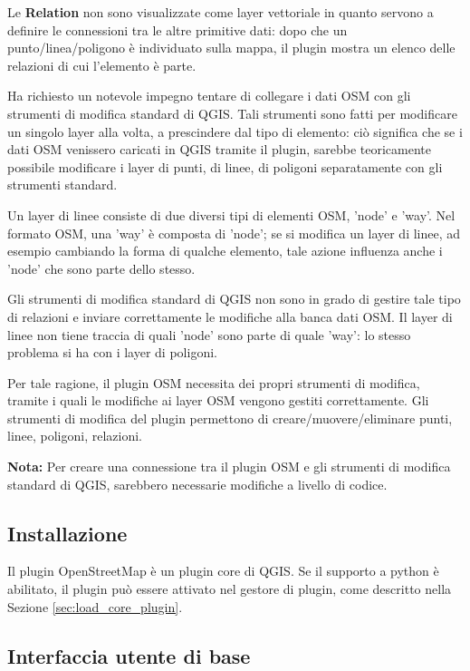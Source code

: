 Le \textbf{Relation} non sono visualizzate come layer vettoriale in quanto servono a definire 
le connessioni tra le altre primitive dati: dopo che un punto/linea/poligono è individuato 
sulla mappa, il plugin mostra un elenco delle relazioni di cui l'elemento è parte.

Ha richiesto un notevole impegno tentare di collegare i dati OSM con gli strumenti di modifica standard 
di QGIS. Tali strumenti sono fatti per modificare un singolo layer alla volta, a prescindere 
dal tipo di elemento: ciò significa che se i dati OSM venissero caricati in QGIS tramite il plugin, 
sarebbe teoricamente possibile modificare i layer di punti, di linee, di poligoni separatamente con 
gli strumenti standard.  

Un layer di linee consiste di due diversi tipi di elementi OSM, 'node' e 'way'. Nel formato OSM, 
una 'way' è composta di 'node'; se si modifica un layer di linee, ad esempio cambiando la 
forma di qualche elemento, tale azione influenza anche i 'node' che sono parte dello stesso.

Gli strumenti di modifica standard di QGIS non sono in grado di gestire tale tipo di relazioni 
e inviare correttamente le modifiche alla banca dati OSM. Il layer di linee non tiene traccia 
di quali 'node' sono parte di quale 'way': lo stesso problema si ha con i layer di poligoni.

Per tale ragione, il plugin OSM necessita dei propri strumenti di modifica, tramite i quali le modifiche 
ai layer OSM vengono gestiti correttamente. 
Gli strumenti di modifica del plugin permettono di creare/muovere/eliminare punti, linee, poligoni, 
relazioni.

\textbf{Nota:} Per creare una connessione tra il plugin OSM e gli strumenti di modifica standard 
di QGIS, sarebbero necessarie modifiche a livello di codice.

\subsection{Installazione}

Il plugin OpenStreetMap è un plugin core di QGIS. Se il supporto a python è abilitato, 
il plugin può essere attivato nel gestore di plugin, come descritto nella Sezione \ref{sec:load_core_plugin}.

\subsection{Interfaccia utente di base}

